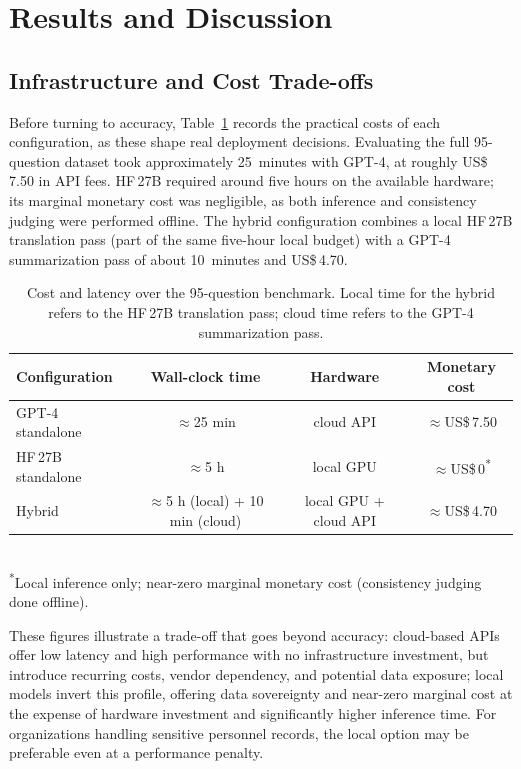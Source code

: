 \documentclass{ceurart}
\begin{document}
\section{Results and Discussion}

\subsection{Infrastructure and Cost Trade-offs}
\label{sec:cost}

Before turning to accuracy, Table~\ref{tab:cost} records the practical costs of
each configuration, as these shape real deployment decisions. Evaluating the full
95-question dataset took approximately 25~minutes with GPT-4, at roughly
US\$\,7.50 in API fees. HF\,27B required around five hours on the available
hardware; its marginal monetary cost was negligible, as both inference and
consistency judging were performed offline. The hybrid configuration combines a local HF\,27B
translation pass (part of the same five-hour local budget) with a GPT-4
summarization pass of about 10~minutes and US\$\,4.70.

\begin{table}[ht]
  \caption{Cost and latency over the 95-question benchmark. Local time for the
           hybrid refers to the HF\,27B translation pass; cloud time refers to the
           GPT-4 summarization pass.}
  \label{tab:cost}
  \centering
  \begin{tabular}{lccc}
    \toprule
    \textbf{Configuration} & \textbf{Wall-clock time} & \textbf{Hardware} & \textbf{Monetary cost} \\
    \midrule
    GPT-4 standalone  & $\approx$25 min            & cloud API         & $\approx$US\$\,7.50 \\
    HF\,27B standalone & $\approx$5 h              & local GPU         & $\approx$US\$\,0\textsuperscript{*} \\
    Hybrid            & $\approx$5 h (local) + 10 min (cloud) & local GPU + cloud API & $\approx$US\$\,4.70 \\
    \bottomrule
  \end{tabular}
  \\[2pt]
  \footnotesize\textsuperscript{*}Local inference only; near-zero marginal monetary cost (consistency judging done offline).
\end{table}

These figures illustrate a trade-off that goes beyond accuracy: cloud-based APIs
offer low latency and high performance with no infrastructure investment, but
introduce recurring costs, vendor dependency, and potential data exposure; local
models invert this profile, offering data sovereignty and near-zero marginal cost
at the expense of hardware investment and significantly higher inference time. For
organizations handling sensitive personnel records, the local option may be
preferable even at a performance penalty.
\end{document}
